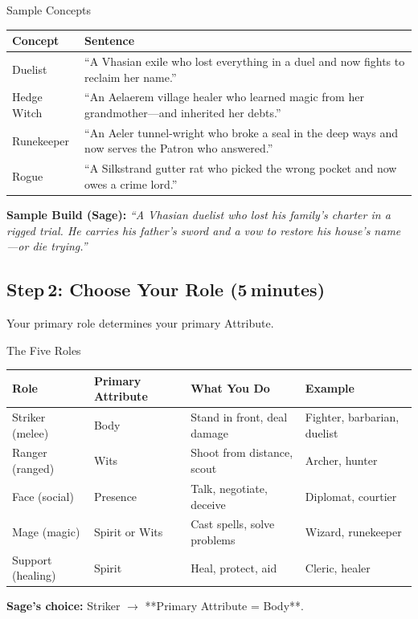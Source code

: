 \documentclass[10pt]{article}
\begin{document}
\begin{charbox}{Sample Concepts}
    \begin{tabular}{p{3cm} p{9cm}}
        \toprule
        \textbf{Concept} & \textbf{Sentence} \\
        \midrule
        Duelist & ``A Vhasian exile who lost everything in a duel and now fights to reclaim her name.'' \\
        Hedge Witch & ``An Aelaerem village healer who learned magic from her grandmother---and inherited her debts.'' \\
        Runekeeper & ``An Aeler tunnel-wright who broke a seal in the deep ways and now serves the Patron who answered.'' \\
        Rogue & ``A Silkstrand gutter rat who picked the wrong pocket and now owes a crime lord.'' \\
        \bottomrule
    \end{tabular}
\end{charbox}

\textbf{Sample Build (Sage):} \textit{``A Vhasian duelist who lost his family's charter in a rigged trial. He carries his father's sword and a vow to restore his house's name---or die trying.''}

\subsection*{Step 2: Choose Your Role (5 minutes)}
Your primary role determines your primary Attribute.

\begin{charbox}{The Five Roles}
    \begin{tabular}{p{2.5cm} p{2.5cm} p{4cm} p{3cm}}
        \toprule
        \textbf{Role} & \textbf{Primary Attribute} & \textbf{What You Do} & \textbf{Example} \\
        \midrule
        Striker (melee) & Body & Stand in front, deal damage & Fighter, barbarian, duelist \\
        Ranger (ranged) & Wits & Shoot from distance, scout & Archer, hunter \\
        Face (social)   & Presence & Talk, negotiate, deceive & Diplomat, courtier \\
        Mage (magic)    & Spirit or Wits & Cast spells, solve problems & Wizard, runekeeper \\
        Support (healing) & Spirit & Heal, protect, aid & Cleric, healer \\
        \bottomrule
    \end{tabular}
\end{charbox}
\textbf{Sage's choice:} Striker $\rightarrow$ **Primary Attribute = Body**.
\end{document}
